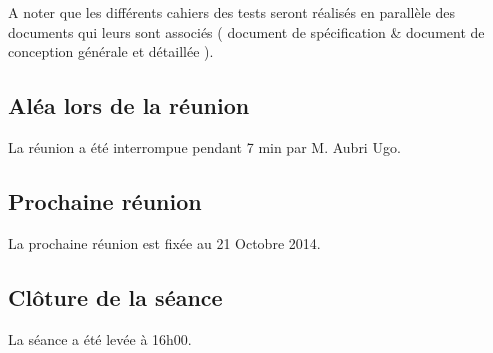 \documentclass{article}
\begin{document}
A noter que les différents cahiers des tests seront réalisés en parallèle des documents qui leurs sont associés ( document de spécification \& document de conception générale et détaillée ).\\

\subsection*{Aléa lors de la réunion}
La réunion a été interrompue pendant 7 min par M. Aubri Ugo. \\

\subsection*{Prochaine réunion}
La prochaine réunion est fixée au 21 Octobre 2014.\\

\subsection*{Clôture de la séance}
La séance a été levée à 16h00. \\
\end{document}

